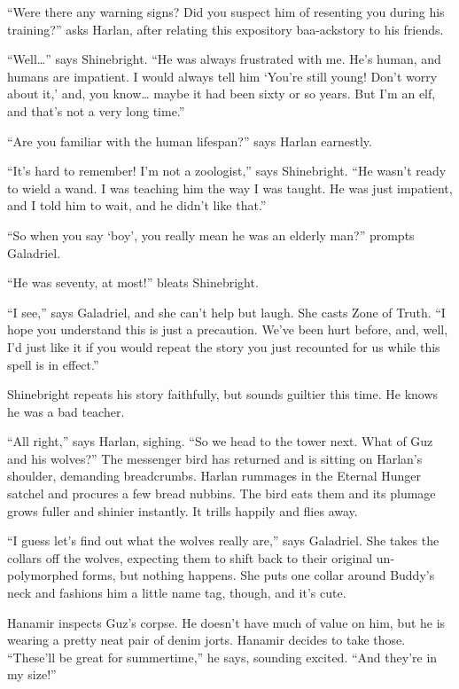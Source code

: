 \documentclass[smalldemyvopaper,11pt,twoside,onecolumn,openright,extrafontsizes]{memoir}
\begin{document}
``Were there any warning signs? Did you suspect him of resenting you
during his training?'' asks Harlan, after relating this expository
baa-ackstory to his friends.

``Well\ldots{}'' says Shinebright. ``He was always frustrated with me.
He's human, and humans are impatient. I would always tell him `You're
still young! Don't worry about it,' and, you know\ldots{} maybe it had
been sixty or so years. But I'm an elf, and that's not a very long
time.''

``Are you familiar with the human lifespan?'' says Harlan earnestly.

``It's hard to remember! I'm not a zoologist,'' says Shinebright. ``He
wasn't ready to wield a wand. I was teaching him the way I was taught.
He was just impatient, and I told him to wait, and he didn't like
that.''

``So when you say `boy', you really mean he was an elderly man?''
prompts Galadriel.

``He was seventy, at most!'' bleats Shinebright.

``I see,'' says Galadriel, and she can't help but laugh. She casts Zone
of Truth. ``I hope you understand this is just a precaution. We've been
hurt before, and, well, I'd just like it if you would repeat the story
you just recounted for us while this spell is in effect.''

Shinebright repeats his story faithfully, but sounds guiltier this time.
He knows he was a bad teacher.

``All right,'' says Harlan, sighing. ``So we head to the tower next.
What of Guz and his wolves?'' The messenger bird has returned and is
sitting on Harlan's shoulder, demanding breadcrumbs. Harlan rummages in
the Eternal Hunger satchel and procures a few bread nubbins. The bird
eats them and its plumage grows fuller and shinier instantly. It trills
happily and flies away.

``I guess let's find out what the wolves really are,'' says Galadriel.
She takes the collars off the wolves, expecting them to shift back to
their original un-polymorphed forms, but nothing happens. She puts one
collar around Buddy's neck and fashions him a little name tag, though,
and it's cute.

Hanamir inspects Guz's corpse. He doesn't have much of value on him, but
he is wearing a pretty neat pair of denim jorts. Hanamir decides to take
those. ``These'll be great for summertime,'' he says, sounding excited.
``And they're in my size!''
\end{document}
